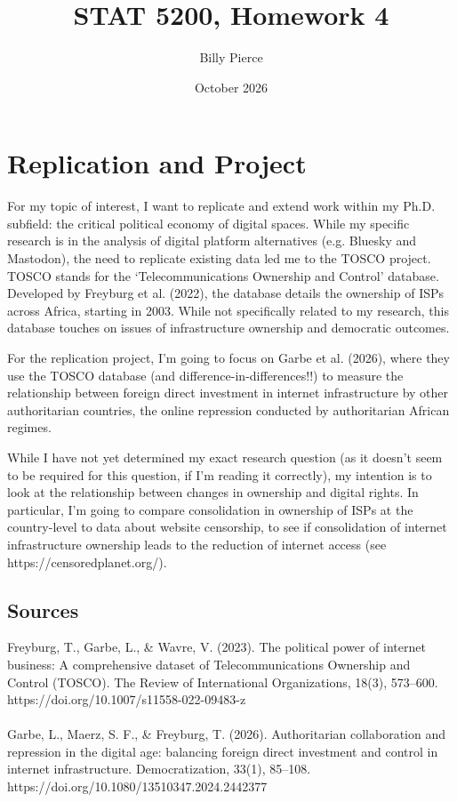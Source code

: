 \documentclass{article}
\title{STAT 5200, Homework 4}
\author{Billy Pierce}
\date{October 2026}
\begin{document}
\maketitle

\section{Replication and Project}

For my topic of interest, I want to replicate and extend work within my Ph.D. subfield: the critical political economy of digital spaces. While my specific research is in the analysis of digital platform alternatives (e.g. Bluesky and Mastodon), the need to replicate existing data led me to the TOSCO project. TOSCO stands for the `Telecommunications Ownership and Control' database. Developed by Freyburg et al. (2022), the database details the ownership of ISPs across Africa, starting in 2003. While not specifically related to my research, this database touches on issues of infrastructure ownership and democratic outcomes.

For the replication project, I'm going to focus on Garbe et al. (2026), where they use the TOSCO database (and difference-in-differences!!) to measure the relationship between foreign direct investment in internet infrastructure by other authoritarian countries, the online repression conducted by authoritarian African regimes.

While I have not yet determined my exact research question (as it doesn't seem to be required for this question, if I'm reading it correctly), my intention is to look at the relationship between changes in ownership and digital rights. In particular, I'm going to compare consolidation in ownership of ISPs at the country-level to data about website censorship, to see if consolidation of internet infrastructure ownership leads to the reduction of internet access (see https://censoredplanet.org/).

\subsection*{Sources}

Freyburg, T., Garbe, L., \& Wavre, V. (2023). The political power of internet business: A comprehensive dataset of Telecommunications Ownership and Control (TOSCO). The Review of International Organizations, 18(3), 573–600. https://doi.org/10.1007/s11558-022-09483-z
\\ \\
\noindent Garbe, L., Maerz, S. F., \& Freyburg, T. (2026). Authoritarian collaboration and repression in the digital age: balancing foreign direct investment and control in internet infrastructure. Democratization, 33(1), 85–108. https://doi.org/10.1080/13510347.2024.2442377
\end{document}

